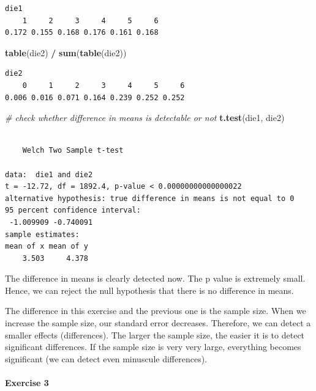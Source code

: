 \documentclass[]{article}
\newenvironment{Shaded}{\begin{snugshade}}{\end{snugshade}}
\newcommand{\KeywordTok}[1]{\textcolor[rgb]{0.13,0.29,0.53}{\textbf{#1}}}
\newcommand{\StringTok}[1]{\textcolor[rgb]{0.31,0.60,0.02}{#1}}
\newcommand{\CommentTok}[1]{\textcolor[rgb]{0.56,0.35,0.01}{\textit{#1}}}
\newcommand{\OperatorTok}[1]{\textcolor[rgb]{0.81,0.36,0.00}{\textbf{#1}}}
\newcommand{\NormalTok}[1]{#1}
\let\oldparagraph\paragraph
\renewcommand{\paragraph}[1]{\oldparagraph{#1}\mbox{}}
\theoremstyle{definition}
\theoremstyle{definition}
\theoremstyle{definition}
\theoremstyle{remark}
\begin{document}
\begin{verbatim}
die1
    1     2     3     4     5     6 
0.172 0.155 0.168 0.176 0.161 0.168 
\end{verbatim}

\begin{Shaded}
\begin{Highlighting}[]
\KeywordTok{table}\NormalTok{(die2) }\OperatorTok{/}\StringTok{ }\KeywordTok{sum}\NormalTok{(}\KeywordTok{table}\NormalTok{(die2))}
\end{Highlighting}
\end{Shaded}

\begin{verbatim}
die2
    0     1     2     3     4     5     6 
0.006 0.016 0.071 0.164 0.239 0.252 0.252 
\end{verbatim}

\begin{Shaded}
\begin{Highlighting}[]
\CommentTok{# check whether difference in means is detectable or not}
\KeywordTok{t.test}\NormalTok{(die1, die2)}
\end{Highlighting}
\end{Shaded}

\begin{verbatim}

    Welch Two Sample t-test

data:  die1 and die2
t = -12.72, df = 1892.4, p-value < 0.00000000000000022
alternative hypothesis: true difference in means is not equal to 0
95 percent confidence interval:
 -1.009909 -0.740091
sample estimates:
mean of x mean of y 
    3.503     4.378 
\end{verbatim}

The difference in means is clearly detected now. The p value is
extremely small. Hence, we can reject the null hypothesis that there is
no difference in means.

The difference in this exercise and the previous one is the sample size.
When we increase the sample size, our standard error decreases.
Therefore, we can detect a smaller effects (differences). The larger the
sample size, the easier it is to detect significant differences. If the
sample size is very very large, everything becomes significant (we can
detect even minuscule differences).

\paragraph{Exercise 3}\label{exercise-3-4}
\end{document}
